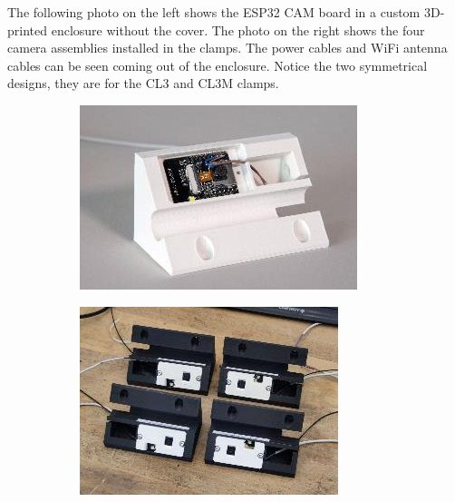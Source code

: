 \documentclass[11pt]{book}
\begin{document}
The following photo on the left shows the ESP32 CAM board in a custom 3D-printed enclosure without the cover. The photo on the right shows the four camera assemblies installed in the clamps. The power cables and WiFi antenna cables can be seen coming out of the enclosure. Notice the two symmetrical designs, they are for the CL3 and CL3M clamps.

\begin{figure}[H]
\centering
\begin{subfigure}[b]{0.45\textwidth}
\centering
\includegraphics[width=\textwidth]{./images/image14.jpeg}
\end{subfigure}
\hfill
\begin{subfigure}[b]{0.45\textwidth}
\centering
\includegraphics[width=\textwidth]{./images/image15.jpeg}
\end{subfigure}
\end{figure}
\end{document}
